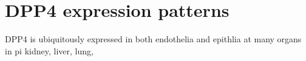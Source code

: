 \section{DPP4 expression patterns}
DPP4 is ubiquitously expressed in both endothelia and epithlia at many organs in pi kidney, liver, lung, 